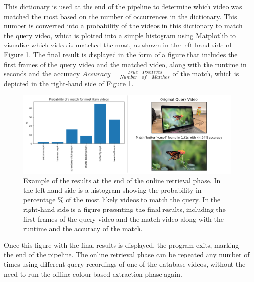 

This dictionary is used at the end of the pipeline to determine which video was matched the most based on the number of occurrences in the dictionary. This number is converted into a probability of the videos in this dictionary to match the query video, which is plotted into a simple histogram using Matplotlib to visualise which video is matched the most, as shown in the left-hand side of Figure \ref{fig:implementation-online-retrieval-results}. The final result is displayed in the form of a figure that includes the first frames of the query video and the matched video, along with the runtime in seconds and the accuracy $Accuracy = \frac{True \quad Positives}{Number \quad of \quad Matches}$ of the match, which is depicted in the right-hand side of Figure \ref{fig:implementation-online-retrieval-results}.\\

\begin{figure}[h] 
\centerline{\includegraphics[width=\textwidth]{figures/implementation/online-retrieval-results.png}}
\caption{\label{fig:implementation-online-retrieval-results}Example of the results at the end of the online retrieval phase. In the left-hand side is a histogram showing the probability in percentage \% of the most likely videos to match the query. In the right-hand side is a figure presenting the final results, including the first frames of the query video and the match video along with the runtime and the accuracy of the match.}
\end{figure}

Once this figure with the final results is displayed, the program exits, marking the end of the pipeline. The online retrieval phase can be repeated any number of times using different query recordings of one of the database videos, without the need to run the offline colour-based extraction phase again.


